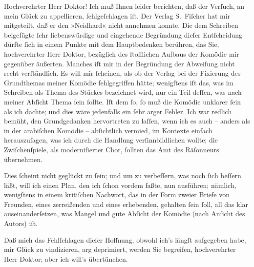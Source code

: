 \pstart{}Hochverehrter Herr Doktor!\pend\vspace{0.5em}
\pstart
           Ich muß Ihnen leider berichten, daß der Verſuch, an mein Glück zu appellieren,
               fehlgeſchlagen iſt. Der Verlag S. Fiſcher hat mir
               mitgeteilt, daß er den »Neidhard« nicht annehmen
               konnte. Die dem Schreiben beigefügte ſehr liebenswürdige und eingehende Begründung
               dieſer Entſcheidung dürfte ſich in einem Punkte mit dem Hauptbedenken berühren, das
               Sie, hochverehrter Herr Doktor, {\pb}bezüglich des
               ſtofflichen Aufbaus der Komödie mir gegenüber äußerten. Manches iſt mir in der
               Begründung der Abweiſung nicht recht verſtändlich. Es will mir ſcheinen, als ob der
               Verlag bei der Fixierung des Grundthemas meiner Komödie fehlgegriffen hätte;
               wenigſtens iſt das, was im Schreiben als Thema des Stückes bezeichnet wird, nur ein
               Teil deſſen, was nach meiner Abſicht Thema ſein ſollte. Iſt dem ſo, ſo muß die
               Komödie unklarer ſein als ich dachte; und dies wäre jedenfalls ein ſehr arger Fehler.
               Ich war redlich bemüht, den Grundgedanken hervortreten zu laſſen, {\pb}wenn ich es auch – anders als in der arabiſchen Komödie – abſichtlich vermied,
               im Kontexte einfach herauszuſagen, was ich durch die Handlung verſinnbildlichen
               wollte; die Zwiſchenſpiele, als moderniſierter Chor, ſollten das Amt des Räſonneurs
               übernehmen.\pend
           
\pstart
           Dies ſcheint nicht geglückt zu ſein; und um zu verbeſſern, was noch ſich beſſern
               läßt, will ich einen Plan, den ich ſchon vordem faßte, nun ausführen; nämlich,
               wenigſtens in einem kritiſchen Nachwort, das in der Form zweier Briefe von Freunden,
               eines zerreißenden und eines erhebenden, {\pb}gehalten
               ſein ſoll, all das klar auseinanderſetzen, was Mangel und gute Abſicht der Komödie
               (nach Anſicht des Autors) iſt.\pend
           
\pstart
           Daß mich das Fehlſchlagen dieſer Hoffnung, obwohl ich’s längſt aufgegeben habe, mir
               Glück zu vindizieren, arg deprimiert, werden Sie begreifen, hochverehrter Herr
               Doktor; aber ich will’s übertünchen.\pend
           
